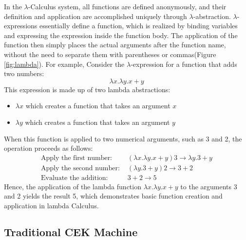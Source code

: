 \documentclass{l4proj}
\begin{document}
In the $\lambda$-Calculus system, all functions are defined anonymously, and their definition and application are accomplished uniquely through $\lambda$-abstraction. $\lambda$-expressions essentially define a function, which is realized by binding variables and expressing the expression inside the function body. The application of the function then simply places the actual arguments after the function name, without the need to separate them with parentheses or commas(Figure \ref{fig:lambda}). For example, Consider the $\lambda$-expression for a function that adds two numbers:
\[
\lambda x.\lambda y.x+y
\]
This expression is made up of two lambda abstractions:
\begin{itemize}
    \item $\lambda x$ which creates a function that takes an argument $x$
    \item $\lambda y$ which creates a function that takes an argument $y$
\end{itemize}
When this function is applied to two numerical arguments, such as 3 and 2, the operation proceeds as follows:
\begin{align*}
\text{Apply the first number: } & (\lambda x.\lambda y.x+y)3 \rightarrow \lambda y.3+y \\
\text{Apply the second number: } & (\lambda y.3+y)2 \rightarrow 3+2 \\
\text{Evaluate the addition: } & 3+2 \rightarrow 5
\end{align*}
Hence, the application of the lambda function \(\lambda x.\lambda y.x+y\) to the arguments 3 and 2 yields the result 5, which demonstrates basic function creation and application in lambda Calculus.

\subsection{Traditional CEK Machine}
\end{document}
